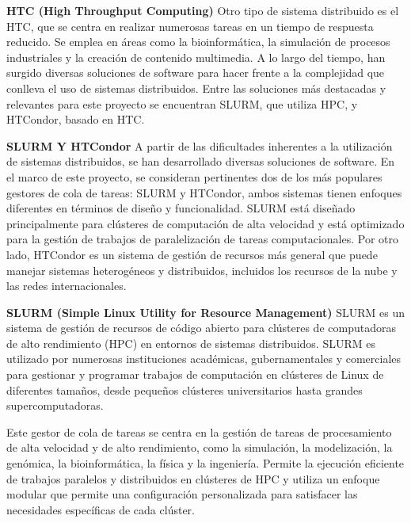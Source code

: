 \begin{spacing}{1.5}
\begin{multicols}{2}
  \textbf{HTC (High Throughput Computing)}
  \newline  
  Otro tipo de sistema distribuido es el HTC, que se centra en realizar numerosas tareas en un tiempo de respuesta reducido. Se emplea en áreas como la bioinformática, la simulación de procesos industriales y la creación de contenido multimedia.
  A lo largo del tiempo, han surgido diversas soluciones de software para hacer frente a la complejidad que conlleva el uso de sistemas distribuidos. Entre las soluciones más destacadas y relevantes para este proyecto se encuentran SLURM, que utiliza HPC, y HTCondor, basado en HTC.  \vspace{3mm}

  \textbf{SLURM Y HTCondor}  
  \newline
  A partir de las dificultades inherentes a la utilización de sistemas distribuidos, se han desarrollado diversas soluciones de software. En el marco de este proyecto, se consideran pertinentes dos de los más populares gestores de cola de tareas: SLURM y HTCondor, ambos sistemas tienen enfoques diferentes en términos de diseño y funcionalidad. SLURM está diseñado principalmente para clústeres de computación de alta velocidad y está optimizado para la gestión de trabajos de paralelización de tareas computacionales. Por otro lado, HTCondor es un sistema de gestión de recursos más general que puede manejar sistemas heterogéneos y distribuidos, incluidos los recursos de la nube y las redes internacionales.\newline

  \textbf{SLURM (Simple Linux Utility for Resource Management)}
  \newline
  SLURM es un sistema de gestión de recursos de código abierto para clústeres de computadoras de alto rendimiento (HPC) en entornos de sistemas distribuidos. SLURM es utilizado por numerosas instituciones académicas, gubernamentales y comerciales para gestionar y programar trabajos de computación en clústeres de Linux de diferentes tamaños, desde pequeños clústeres universitarios hasta grandes supercomputadoras.

  Este gestor de cola de tareas se centra en la gestión de tareas de procesamiento de alta velocidad y de alto rendimiento, como la simulación, la modelización, la genómica, la bioinformática, la física y la ingeniería. Permite la ejecución eficiente de trabajos paralelos y distribuidos en clústeres de HPC y utiliza un enfoque modular que permite una configuración personalizada para satisfacer las necesidades específicas de cada clúster.


\end{multicols}
\end{spacing}
